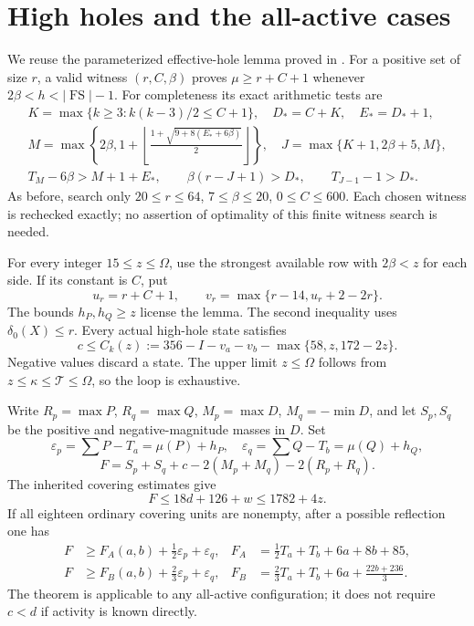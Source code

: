 \documentclass[11pt,a4paper]{article}
\newcommand{\FS}{\operatorname{FS}}
\newcommand{\T}{\mathcal T}
\begin{document}
\section{High holes and the all-active cases}
We reuse the parameterized effective-hole lemma proved in \cite{base100}.
For a positive set of size $r$, a valid witness $(r,C,\beta)$ proves
$\mu\ge r+C+1$ whenever $2\beta<h<|\FS|-1$.
For completeness its exact arithmetic tests are
\begin{gather*}
 K=\max\{k\ge3:k(k-3)/2\le C+1\},\quad D_*=C+K,\quad E_*=D_*+1,\\
 M=\max\left\{2\beta,1+\left\lfloor
 \frac{1+\sqrt{9+8(E_*+6\beta)}}2\right\rfloor\right\},\quad
 J=\max\{K+1,2\beta+5,M\},\\
 T_M-6\beta>M+1+E_*,\qquad
 \beta(r-J+1)>D_*,\qquad T_{J-1}-1>D_*.
\end{gather*}
As before, search only $20\le r\le64$, $7\le\beta\le20$, $0\le C\le600$.
Each chosen witness is rechecked exactly; no assertion of optimality of
this finite witness search is needed.

For every integer $15\le z\le\Omega$, use the strongest available row
with $2\beta<z$ for each side. If its constant is $C$, put
\[
 u_r=r+C+1,\qquad v_r=\max\{r-14,u_r+2-2r\}.
\]
The bounds $h_P,h_Q\ge z$ license the lemma. The second inequality uses
$\delta_0(X)\le r$. Every actual high-hole state satisfies
\begin{equation}\label{eq:cmax}
 c\le C_k(z):=356-I-v_a-v_b-\max\{58,z,172-2z\}.
\end{equation}
Negative values discard a state. The upper limit $z\le\Omega$ follows
from $z\le\kappa\le\T\le\Omega$, so the loop is exhaustive.

Write $R_p=\max P$, $R_q=\max Q$, $M_p=\max D$, $M_q=-\min D$,
and let $S_p,S_q$ be the positive and negative-magnitude masses in $D$.
Set
\[
 \varepsilon_p=\sum P-T_a=\mu(P)+h_P,\quad
 \varepsilon_q=\sum Q-T_b=\mu(Q)+h_Q,
\]
\[
 F=S_p+S_q+c-2(M_p+M_q)-2(R_p+R_q).
\]
The inherited covering estimates give
\begin{equation}\label{eq:Fupper}
 F\le18d+126+w\le1782+4z.
\end{equation}
If all eighteen ordinary covering units are nonempty, after a possible
reflection one has
\begin{align}
 F&\ge F_A(a,b)+\tfrac12\varepsilon_p+\varepsilon_q,
 &F_A&=\tfrac12T_a+T_b+6a+8b+85,\label{eq:FA}\\
 F&\ge F_B(a,b)+\tfrac23\varepsilon_p+\varepsilon_q,
 &F_B&=\tfrac23T_a+T_b+6a+\tfrac{22b+236}{3}.\label{eq:FB}
\end{align}
The theorem is applicable to any all-active configuration; it does not
require $c<d$ if activity is known directly.
\end{document}
